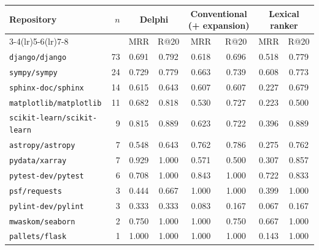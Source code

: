 \begin{tabular}{lrcccccc}
\toprule
Repository & $n$ & \multicolumn{2}{c}{Delphi} & \multicolumn{2}{c}{Conventional (+ expansion)} & \multicolumn{2}{c}{Lexical ranker} \\
\cmidrule(lr){3-4}\cmidrule(lr){5-6}\cmidrule(lr){7-8}
 & & MRR & R@20 & MRR & R@20 & MRR & R@20 \\
\midrule
\texttt{django/django} & 73 & 0.691 & 0.792 & 0.618 & 0.696 & 0.518 & 0.779 \\
\texttt{sympy/sympy} & 24 & 0.729 & 0.779 & 0.663 & 0.739 & 0.608 & 0.773 \\
\texttt{sphinx-doc/sphinx} & 14 & 0.615 & 0.643 & 0.607 & 0.607 & 0.227 & 0.679 \\
\texttt{matplotlib/matplotlib} & 11 & 0.682 & 0.818 & 0.530 & 0.727 & 0.223 & 0.500 \\
\texttt{scikit-learn/scikit-learn} & 9 & 0.815 & 0.889 & 0.623 & 0.722 & 0.396 & 0.889 \\
\texttt{astropy/astropy} & 7 & 0.548 & 0.643 & 0.762 & 0.786 & 0.275 & 0.762 \\
\texttt{pydata/xarray} & 7 & 0.929 & 1.000 & 0.571 & 0.500 & 0.307 & 0.857 \\
\texttt{pytest-dev/pytest} & 6 & 0.708 & 1.000 & 0.843 & 1.000 & 0.722 & 0.833 \\
\texttt{psf/requests} & 3 & 0.444 & 0.667 & 1.000 & 1.000 & 0.399 & 1.000 \\
\texttt{pylint-dev/pylint} & 3 & 0.333 & 0.333 & 0.083 & 0.167 & 0.067 & 0.167 \\
\texttt{mwaskom/seaborn} & 2 & 0.750 & 1.000 & 1.000 & 0.750 & 0.667 & 1.000 \\
\texttt{pallets/flask} & 1 & 1.000 & 1.000 & 1.000 & 1.000 & 0.143 & 1.000 \\
\bottomrule
\end{tabular}%